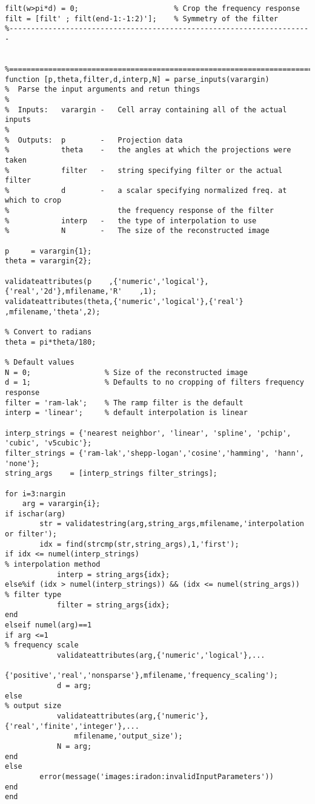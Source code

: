 \begin{lstlisting}
filt(w>pi*d) = 0;                      % Crop the frequency response
filt = [filt' ; filt(end-1:-1:2)'];    % Symmetry of the filter
%----------------------------------------------------------------------


%======================================================================
function [p,theta,filter,d,interp,N] = parse_inputs(varargin)
%  Parse the input arguments and retun things
%
%  Inputs:   varargin -   Cell array containing all of the actual inputs
%
%  Outputs:  p        -   Projection data
%            theta    -   the angles at which the projections were taken
%            filter   -   string specifying filter or the actual filter
%            d        -   a scalar specifying normalized freq. at which to crop
%                         the frequency response of the filter
%            interp   -   the type of interpolation to use
%            N        -   The size of the reconstructed image

p     = varargin{1};
theta = varargin{2};

validateattributes(p    ,{'numeric','logical'},{'real','2d'},mfilename,'R'    ,1);
validateattributes(theta,{'numeric','logical'},{'real'}     ,mfilename,'theta',2);

% Convert to radians
theta = pi*theta/180;

% Default values
N = 0;                 % Size of the reconstructed image
d = 1;                 % Defaults to no cropping of filters frequency response
filter = 'ram-lak';    % The ramp filter is the default
interp = 'linear';     % default interpolation is linear

interp_strings = {'nearest neighbor', 'linear', 'spline', 'pchip', 'cubic', 'v5cubic'};
filter_strings = {'ram-lak','shepp-logan','cosine','hamming', 'hann', 'none'};
string_args    = [interp_strings filter_strings];

for i=3:nargin
    arg = varargin{i};
if ischar(arg)
        str = validatestring(arg,string_args,mfilename,'interpolation or filter');
        idx = find(strcmp(str,string_args),1,'first');
if idx <= numel(interp_strings)
% interpolation method
            interp = string_args{idx};
else%if (idx > numel(interp_strings)) && (idx <= numel(string_args))
% filter type
            filter = string_args{idx};
end
elseif numel(arg)==1
if arg <=1
% frequency scale
            validateattributes(arg,{'numeric','logical'},...
                {'positive','real','nonsparse'},mfilename,'frequency_scaling');
            d = arg;
else
% output size
            validateattributes(arg,{'numeric'},{'real','finite','integer'},...
                mfilename,'output_size');
            N = arg;
end
else
        error(message('images:iradon:invalidInputParameters'))
end
end


\end{lstlisting}
